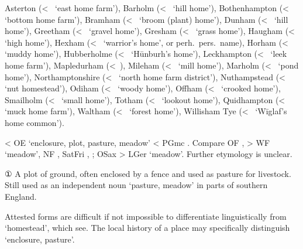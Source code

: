 \documentclass[12pt,letterpaper,oneside,article,draft]{memoir}
\begin{document}
\begin{Lemma}
\begin{Examples}
	Asterton (<~ ‘east home farm’), Barholm (<~ ‘hill home’), Bothenhampton (<~ ‘bottom home farm’), Bramham (<~ ‘broom (plant) home’), Dunham (<~ ‘hill home’), Greetham (<~ ‘gravel home’), Gresham (<~ ‘grass home’), Haugham (<~ ‘high home’), Hexham (<~ ‘warrior’s home’, or perh.\ pers.\ name), Horham (<~ ‘muddy home’), Hubberholme (<~ ‘Hūnburh’s home’), Leckhampton (<~ ‘leek home farm’), Mapledurham (<~), Mileham (<~ ‘mill home’), Marholm (<~ ‘pond home’), Northamptonshire (<~ ‘north home farm district’), Nuthampstead (<~ ‘nut homestead’), Odiham (<~ ‘woody home’), Offham (<~ ‘crooked home’), Smailholm (<~ ‘small home’), Totham (<~ ‘lookout home’), Quidhampton (<~ ‘muck home farm’), Waltham (<~ ‘forest home’), Willisham Tye (<~ ‘Wīglaf’s home common’).
\end{Examples}
\end{Lemma}

\begin{Lemma}
\begin{Etymology}
	< OE  ‘enclosure, plot, pasture, meadow’ < PGmc .
	Compare
	OF ,  > WF  ‘meadow’, NF , SatFri , ;
	OSax  > LGer  ‘meadow’.
	Further etymology is unclear.
\end{Etymology}
\begin{Definitions}
		① A plot of ground, often enclosed by a fence and used as pasture for livestock. Still used as an independent noun  ‘pasture, meadow’ in parts of southern England.
\end{Definitions}
\begin{Examples}
	Attested forms are difficult if not impossible to differentiate linguistically from  ‘homestead’, which see. The local history of a place may specifically distinguish  ‘enclosure, pasture’.
\end{Examples}
\end{Lemma}
\end{document}
